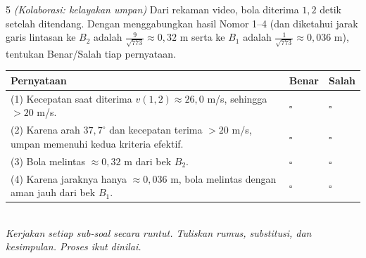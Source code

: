 \documentclass[11pt]{article}
\makeatletter
\newenvironment{bstabel}{%
  \par\smallskip\begin{center}\renewcommand{\arraystretch}{1.35}%
  \begin{tabular}{@{}p{0.72\textwidth}>{\centering\arraybackslash}m{1.5cm}>{\centering\arraybackslash}m{1.5cm}@{}}
  \toprule
  \textbf{Pernyataan} & \textbf{Benar} & \textbf{Salah}\\\midrule}%
  {\bottomrule\end{tabular}\end{center}}
\newcommand{\bs}[1]{#1 & $\square$ & $\square$\\[1pt]}
\makeatother
\begin{document}
\begin{soal}{5 \normalfont\itshape(Kolaborasi: kelayakan umpan)}
Dari rekaman video, bola diterima $1{,}2$ detik setelah ditendang. Dengan
menggabungkan hasil Nomor 1--4 (dan diketahui jarak garis lintasan ke $B_2$
adalah $\tfrac{9}{\sqrt{773}}\approx 0{,}32$ m serta ke $B_1$ adalah
$\tfrac{1}{\sqrt{773}}\approx 0{,}036$ m), tentukan Benar/Salah tiap pernyataan.
\begin{bstabel}
  \bs{(1) Kecepatan saat diterima $v(1{,}2)\approx 26{,}0$ m/s, sehingga $>20$ m/s.}
  \bs{(2) Karena arah $37{,}7^\circ$ dan kecepatan terima $>20$ m/s, umpan memenuhi kedua kriteria efektif.}
  \bs{(3) Bola melintas $\approx 0{,}32$ m dari bek $B_2$.}
  \bs{(4) Karena jaraknya hanya $\approx 0{,}036$ m, bola melintas dengan aman jauh dari bek $B_1$.}
\end{bstabel}
\end{soal}

\clearpage
{}\\[0.2em]
\small\emph{Kerjakan setiap sub-soal secara runtut. Tuliskan rumus, substitusi,
dan kesimpulan. Proses ikut dinilai.}\normalsize

\bigskip
\end{document}
